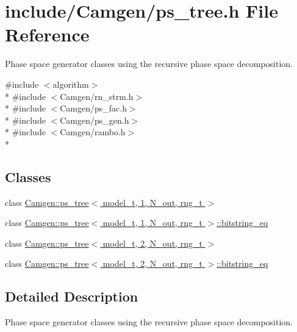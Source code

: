 \hypertarget{a00718}{\section{include/\-Camgen/ps\-\_\-tree.h File Reference}
\label{a00718}
}


Phase space generator classes using the recursive phase space decomposition.  


{\ttfamily \#include $<$algorithm$>$}\\*
{\ttfamily \#include $<$Camgen/rn\-\_\-strm.\-h$>$}\\*
{\ttfamily \#include $<$Camgen/ps\-\_\-fac.\-h$>$}\\*
{\ttfamily \#include $<$Camgen/ps\-\_\-gen.\-h$>$}\\*
{\ttfamily \#include $<$Camgen/rambo.\-h$>$}\\*
\subsection*{Classes}
\begin{DoxyCompactItemize}
\item 
class \hyperlink{a00446}{Camgen\-::ps\-\_\-tree$<$ model\-\_\-t, 1, N\-\_\-out, rng\-\_\-t $>$}
\item 
class \hyperlink{a00032}{Camgen\-::ps\-\_\-tree$<$ model\-\_\-t, 1, N\-\_\-out, rng\-\_\-t $>$\-::bitstring\-\_\-eq}
\item 
class \hyperlink{a00447}{Camgen\-::ps\-\_\-tree$<$ model\-\_\-t, 2, N\-\_\-out, rng\-\_\-t $>$}
\item 
class \hyperlink{a00031}{Camgen\-::ps\-\_\-tree$<$ model\-\_\-t, 2, N\-\_\-out, rng\-\_\-t $>$\-::bitstring\-\_\-eq}
\end{DoxyCompactItemize}


\subsection{Detailed Description}
Phase space generator classes using the recursive phase space decomposition. 